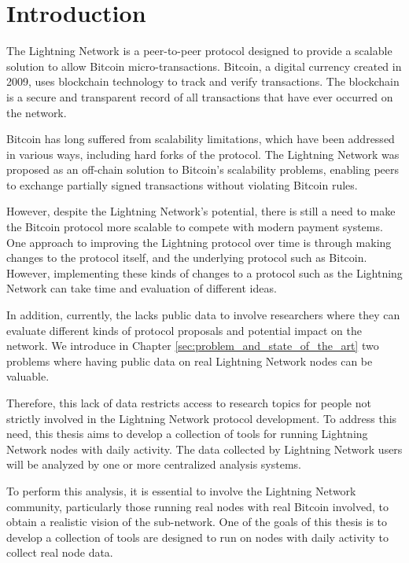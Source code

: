 \setcounter{page}{1}
\chapter{Introduction}\label{sec:introduction}

The Lightning Network is a peer-to-peer protocol designed to
provide a scalable solution to allow Bitcoin micro-transactions.
Bitcoin, a digital currency created in 2009, uses blockchain technology
to track and verify transactions. The blockchain is a secure and transparent
record of all transactions that have ever occurred on the network.

Bitcoin has long suffered from scalability limitations, which have been
addressed in various ways, including hard forks of the protocol.
The Lightning Network was proposed as an off-chain solution to Bitcoin's
scalability problems, enabling peers to exchange partially signed transactions
without violating Bitcoin rules.

However, despite the Lightning Network's potential, there is still a need
to make the Bitcoin protocol more scalable to compete with modern payment systems.
One approach to improving the Lightning protocol over time is through making changes
to the protocol itself, and the underlying protocol such as Bitcoin. However,
implementing these kinds of changes to a protocol such as the Lightning Network
can take time and evaluation of different ideas.

In addition, currently, the {\LN} lacks public data to involve researchers
where they can evaluate different kinds of protocol proposals and
potential impact on the network. We introduce in Chapter \ref{sec:problem_and_state_of_the_art}
two problems where having public data on real Lightning Network nodes can be valuable.

Therefore, this lack of data restricts access to research topics for
people not strictly involved in the Lightning Network protocol development.
To address this need, this thesis aims to develop a collection of tools for
running Lightning Network nodes with daily activity. The data collected by
Lightning Network users will be analyzed by one or more centralized
analysis systems.

To perform this analysis, it is essential to involve the Lightning Network
community, particularly those running real nodes with real Bitcoin involved,
to obtain a realistic vision of the sub-network. 
One of the goals of this thesis is to develop a collection of 
tools are designed to run on nodes with daily activity to 
collect real node data.


